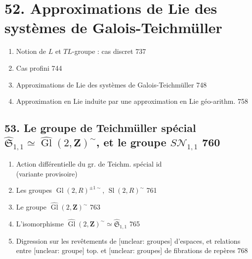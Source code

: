\newpage


\chapter*{52. Approximations de Lie des systèmes de Galois-Teichmüller}

\begin{enumerate}
    \item[1º)] Notion de $L$ et $TL$-groupe : cas discret \hfill 737
    \item[2º)] Cas profini \hfill 744
    \item[3º)] Approximations de Lie des systèmes de Galois-Teichmüller \hfill 748
    \item[4º)] Approximation en Lie induite par une approximation en Lie géo-arithm. \hfill 758
\end{enumerate}

\vspace{1em}

\section*{53. Le groupe de Teichmüller spécial $\widehat{\mathfrak{S}}_{1,1} \simeq \widehat{\operatorname{Gl}}(2, \mathbf{Z})^\sim$, et le groupe $S\mathcal{N}_{1,1}$ \hfill 760}

\begin{enumerate}
    \item[1º)] Action différentielle du gr. de Teichm. spécial \hfill id \\
    (variante provisoire)
    \item[2º)] Les groupes $\operatorname{Gl}(2, R)^{\pm 1 \sim}$, $\operatorname{Sl}(2, R)^\sim$ \hfill 761
    \item[3º)] Le groupe $\widehat{\operatorname{Gl}}(2, \mathbf{Z})^\sim$ \hfill 763
    \item[4º)] L'isomorphisme $\widehat{\operatorname{Gl}}(2, \mathbf{Z})^\sim \simeq \widehat{\mathfrak{S}}_{1,1}$ \hfill 765
    \item[5º)] Digression sur les revêtements de [unclear: groupes] d'espaces, et relations entre [unclear: groupe] top. et [unclear: groupes] de fibrations de repères \hfill 768
\end{enumerate}

